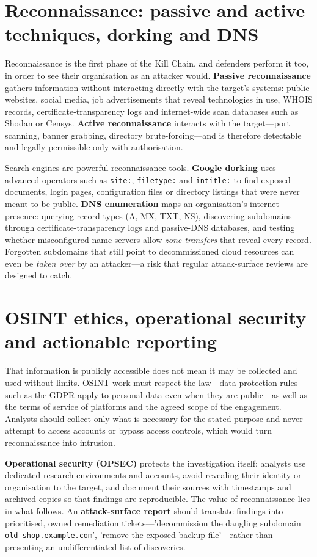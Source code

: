 \section{Reconnaissance: passive and active techniques, dorking and DNS}\label{sec:12.3}
Reconnaissance is the first phase of the Kill Chain, and defenders perform it too, in order to see their organisation as an attacker would. \textbf{Passive reconnaissance} gathers information without interacting directly with the target's systems: public websites, social media, job advertisements that reveal technologies in use, WHOIS records, certificate-transparency logs and internet-wide scan databases such as Shodan or Censys. \textbf{Active reconnaissance} interacts with the target—port scanning, banner grabbing, directory brute-forcing—and is therefore detectable and legally permissible only with authorisation.

Search engines are powerful reconnaissance tools. \textbf{Google dorking} uses advanced operators such as \texttt{site:}, \texttt{filetype:} and \texttt{intitle:} to find exposed documents, login pages, configuration files or directory listings that were never meant to be public. \textbf{DNS enumeration} maps an organisation's internet presence: querying record types (A, MX, TXT, NS), discovering subdomains through certificate-transparency logs and passive-DNS databases, and testing whether misconfigured name servers allow \emph{zone transfers} that reveal every record. Forgotten subdomains that still point to decommissioned cloud resources can even be \emph{taken over} by an attacker—a risk that regular attack-surface reviews are designed to catch.

\section{OSINT ethics, operational security and actionable reporting}\label{sec:12.4}
That information is publicly accessible does not mean it may be collected and used without limits. OSINT work must respect the law—data-protection rules such as the GDPR apply to personal data even when they are public—as well as the terms of service of platforms and the agreed scope of the engagement. Analysts should collect only what is necessary for the stated purpose and never attempt to access accounts or bypass access controls, which would turn reconnaissance into intrusion.

\textbf{Operational security (OPSEC)} protects the investigation itself: analysts use dedicated research environments and accounts, avoid revealing their identity or organisation to the target, and document their sources with timestamps and archived copies so that findings are reproducible. The value of reconnaissance lies in what follows. An \textbf{attack-surface report} should translate findings into prioritised, owned remediation tickets—'decommission the dangling subdomain \texttt{old-shop.example.com}', 'remove the exposed backup file'—rather than presenting an undifferentiated list of discoveries.

